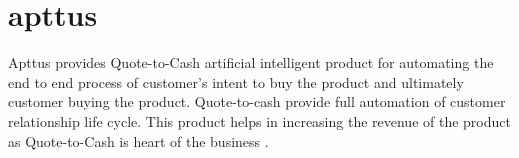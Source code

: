 \section{apttus}

Apttus provides Quote-to-Cash artificial intelligent product for automating the end to end process of customer's intent to buy the product and ultimately customer buying the product. Quote-to-cash provide full automation of customer relationship life cycle. This product helps in increasing the revenue of the product as Quote-to-Cash is heart of the business \cites{hid-sp18-511-apttus}.

